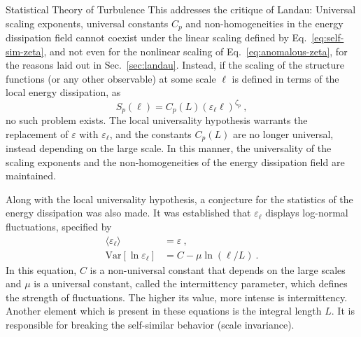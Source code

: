 \begin{chapter}{Statistical Theory of Turbulence}
This addresses the critique of Landau: Universal scaling exponents, universal constants $C_p$ and non-homogeneities in the energy dissipation field cannot coexist under the linear scaling defined by Eq.~\eqref{eq:self-sim-zeta}, and not even for the nonlinear scaling of Eq.~\eqref{eq:anomalous-zeta}, for the reasons laid out in Sec.~\ref{sec:landau}. Instead, if the scaling of the structure functions (or any other observable) at some scale $\ell$ is defined in terms of the local energy dissipation, as
\begin{equation}
    S_{p}(\ell) = C_{p}(L)(\varepsilon_{\ell} \ell)^{\zeta_{p}} \ ,
\end{equation}
no such problem exists. The local universality hypothesis warrants the replacement of $\varepsilon$ with $\varepsilon_{\ell}$, and the constants $C_p(L)$ are no longer universal, instead depending on the large scale. In this manner, the universality of the scaling exponents and the non-homogeneities of the energy dissipation field are maintained.

Along with the local universality hypothesis, a conjecture for
the statistics of the energy dissipation was also made. It was
established that $\varepsilon_{\ell}$ displays log-normal fluctuations,
specified by
\begin{equation} \label{eq:lognormal}
\begin{split}
    \langle \varepsilon_{\ell} \rangle &= \varepsilon \ , \\
    \mathrm{Var}[\ln \varepsilon_{\ell}] &= C - \mu \ln (\ell / L) \ .
\end{split}
\end{equation}
In this equation, $C$ is a non-universal constant that depends on the large scales
and $\mu$ is a universal constant, called the intermittency parameter,
which defines the strength of fluctuations. The higher
its value, more intense is intermittency.
Another element which is present in these equations is the
integral length $L$. It is responsible for breaking the self-similar
behavior (scale invariance).


\end{chapter}
